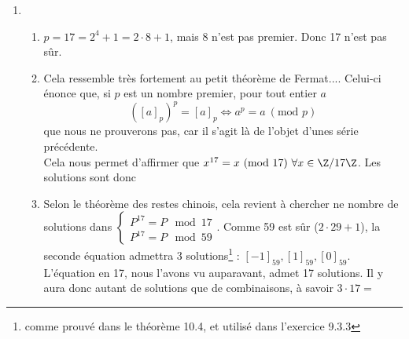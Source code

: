 \documentclass[10p,a4paper]{scrartcl}
\begin{document}
\begin{enumerate}
	
	\item	\begin{enumerate}
				\item 	$p = 17 = 2^{4} + 1 = 2\cdot 8 + 1$, mais 8 n'est pas premier. Donc 17 n'est pas sûr.	
				\item 	Cela ressemble très fortement au petit théorème de Fermat.... Celui-ci énonce que, si $p$ est un nombre premier, pour tout entier $a$ 
						\begin{equation*}
							([a]_p)^p = [a]_p \iff a^p = a\ (\text{mod }p)		
						\end{equation*}
						que nous ne prouverons pas, car il s'agit là de l'objet d'unes série précédente.\\
						Cela nous permet d'affirmer que $x^{17} = x\ (\text{mod }17) \ \forall x \in \Z/17\Z$. Les solutions sont donc 
				\item 	Selon le théorème des restes chinois, cela revient à chercher ne nombre de solutions dans 
				$\left\{
					\begin{array}{l}
					P^{17} = P \mod 17\\
					P^{17} = P \mod 59
					\end{array}
				\right.$. Comme 59 est sûr ($2 \cdot 29 +1$), la seconde équation admettra 3 solutions\footnote{comme prouvé dans le théorème 10.4, et utilisé dans l'exercice 9.3.3} : $[-1]_{59},[1]_{59},[0]_{59}$. L'équation en 17, nous l'avons vu auparavant, admet 17 solutions. Il y aura donc autant de solutions que de combinaisons, à savoir $3 \cdot 17 =$ 
			\end{enumerate}
\end{enumerate}
\end{document}
